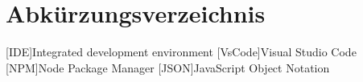 \chapter*{Abkürzungsverzeichnis}

\begin{acronym}[LoRaWAN]

[IDE]{Integrated development environment}
[VsCode]{Visual Studio Code}
[NPM]{Node Package Manager}
[JSON]{JavaScript Object Notation}


\end{acronym}
